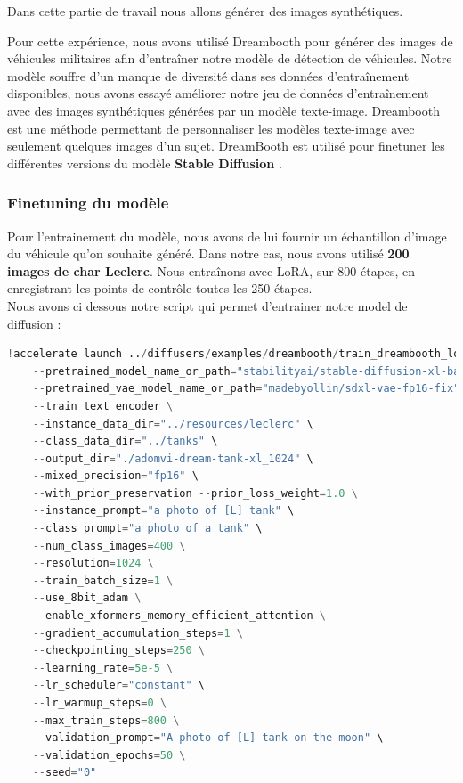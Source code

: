 Dans cette partie de travail nous allons générer des images synthétiques.

Pour cette expérience, nous avons utilisé Dreambooth \cite{ruiz2023dreambooth} pour générer des images de véhicules militaires afin d'entraîner notre modèle de détection de véhicules.
Notre modèle souffre d'un manque de diversité dans ses données d'entraînement disponibles, nous avons essayé améliorer notre jeu de données d'entraînement avec des images synthétiques générées par un modèle texte-image.
Dreambooth est une méthode permettant de personnaliser les modèles texte-image avec seulement quelques images d'un sujet.
DreamBooth est utilisé pour finetuner les différentes versions du modèle \textbf{Stable Diffusion} \cite{rombach2021highresolution}.\\



\subsubsection{Finetuning du modèle}

Pour l'entrainement du modèle, nous avons de lui fournir un échantillon d'image du véhicule qu'on souhaite généré.
Dans notre cas, nous avons utilisé \textbf{200 images de char Leclerc}.
Nous entraînons avec LoRA, sur 800 étapes, en enregistrant les points de contrôle toutes les 250 étapes.\\

Nous avons ci dessous notre script qui permet d'entrainer notre model de diffusion :

\lstset{style=mystyle}

\begin{lstlisting}[language=Python, basicstyle=\footnotesize\ttfamily, breaklines=false]
!accelerate launch ../diffusers/examples/dreambooth/train_dreambooth_lora_sdxl.py \
    --pretrained_model_name_or_path="stabilityai/stable-diffusion-xl-base-1.0" \
    --pretrained_vae_model_name_or_path="madebyollin/sdxl-vae-fp16-fix" \
    --train_text_encoder \
    --instance_data_dir="../resources/leclerc" \
    --class_data_dir="../tanks" \
    --output_dir="./adomvi-dream-tank-xl_1024" \
    --mixed_precision="fp16" \
    --with_prior_preservation --prior_loss_weight=1.0 \
    --instance_prompt="a photo of [L] tank" \
    --class_prompt="a photo of a tank" \
    --num_class_images=400 \
    --resolution=1024 \
    --train_batch_size=1 \
    --use_8bit_adam \
    --enable_xformers_memory_efficient_attention \
    --gradient_accumulation_steps=1 \
    --checkpointing_steps=250 \
    --learning_rate=5e-5 \
    --lr_scheduler="constant" \
    --lr_warmup_steps=0 \
    --max_train_steps=800 \
    --validation_prompt="A photo of [L] tank on the moon" \
    --validation_epochs=50 \
    --seed="0"
\end{lstlisting}

